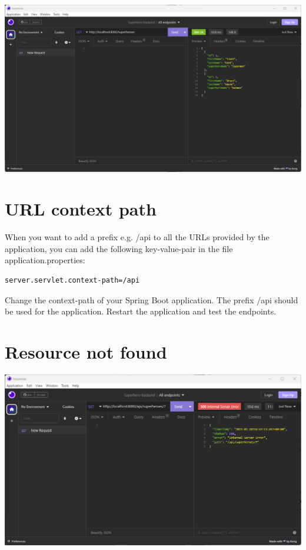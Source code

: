 \includegraphics[width=\textwidth]{./images/chapter2/get-request-insomnia.png}

\section{URL context path}

When you want to add a prefix e.g. /api to all the URLs provided by the application, you can add the following key-value-pair in the file application.properties:

\begin{lstlisting}[frame=single]
server.servlet.context-path=/api
\end{lstlisting}


\begin{oefening}
Change the context-path of your Spring Boot application. The prefix /api should be used for the application.  Restart the application and test the endpoints.
\end{oefening}

\section{Resource not found}

\includegraphics[width=\textwidth]{./images/chapter2/not_found_1.png}

